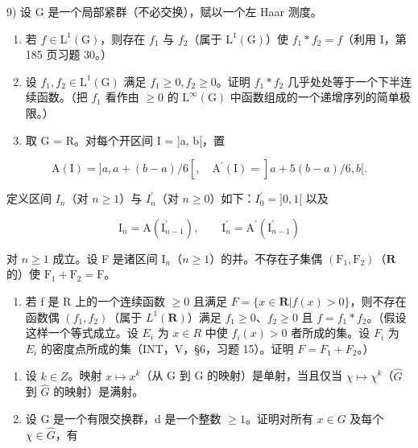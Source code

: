 9) 设 G 是一个局部紧群（不必交换），赋以一个左 Haar 测度。

\begin{enumerate}
\def\labelenumi{\alph{enumi})}
\item
  若 \(f \in \mathrm{L}^{1}(\mathrm{G})\)，则存在 \(f_{1}\) 与 \(f_{2}\)（属于 \(\mathrm{L}^{1}(\mathrm{G})\)）使 \(f_{1} * f_{2} = f\)（利用 I，第 185 页习题 30。）
\item
  设 \(f_{1}, f_{2} \in \mathrm{L}^{1}(\mathrm{G})\) 满足 \(f_{1} \geqslant 0, f_{2} \geqslant 0\)。证明 \(f_{1} * f_{2}\) 几乎处处等于一个下半连续函数。（把 \(f_{1}\) 看作由 \(\geqslant 0\) 的 \(\mathrm{L}^{\infty}(\mathrm{G})\) 中函数组成的一个递增序列的简单极限。）
\item
  取 G = R。对每个开区间 I = {]}a, b{[}，置
\end{enumerate}

\[
\mathrm{A} (\mathrm{I}) = ] a, a + (b - a) / 6 [, \quad \mathrm{A} ^ {\prime} (\mathrm{I}) = ] a + 5 (b - a) / 6, b [.
\]

定义区间 \(I_{n}\)（对 \(n \geqslant 1\)）与 \(I_{n}^{\prime}\)（对 \(n \geqslant 0\)）如下：\(I_{0}^{\prime} = ]0, 1[\) 以及

\[
\mathrm{I} _ {n} = \mathrm{A} (\mathrm{I} _ {n - 1} ^ {\prime}), \qquad \mathrm{I} _ {n} ^ {\prime} = \mathrm{A} ^ {\prime} (\mathrm{I} _ {n - 1} ^ {\prime})
\]

对 \(n \geqslant 1\) 成立。设 F 是诸区间 \(\mathrm{I}_n\)（\(n \geqslant 1\)）的并。不存在子集偶 \((\mathrm{F}_1, \mathrm{F}_2)\)（\(\mathbf{R}\) 的）使 \(\mathrm{F}_1 + \mathrm{F}_2 = \mathrm{F}\)。

\begin{enumerate}
\def\labelenumi{\alph{enumi})}
\setcounter{enumi}{3}
\tightlist
\item
  若 f 是 R 上的一个连续函数 \(\geqslant 0\) 且满足 \(F = \{x \in \mathbf{R} | f(x) > 0\}\)，则不存在函数偶 \((f_{1}, f_{2})\)（属于 \(L^{1}(\mathbf{R})\)）满足 \(f_{1} \geqslant 0\)、\(f_{2} \geqslant 0\) 且 \(f = f_{1} * f_{2}\)。（假设这样一个等式成立。设 \(E_{i}\) 为 \(x \in R\) 中使 \(f_{i}(x) > 0\) 者所成的集。设 \(F_{i}\) 为 \(E_{i}\) 的密度点所成的集（INT，V，§6，习题 15）。证明 \(F = F_{1} + F_{2}\)。）
\end{enumerate}

\begin{enumerate}
\def\labelenumi{\arabic{enumi})}
\setcounter{enumi}{9}
\item
  设 \(k \in Z\)。映射 \(x \mapsto x^{k}\)（从 G 到 G 的映射）是单射，当且仅当 \(\chi \mapsto \chi^{k}\)（\(\widehat{G}\) 到 \(\widehat{G}\) 的映射）是满射。
\item
  设 G 是一个有限交换群，d 是一个整数 \(\geqslant 1\)。证明对所有 \(x \in G\) 及每个 \(\chi \in \widehat{G}\)，有
\end{enumerate}

